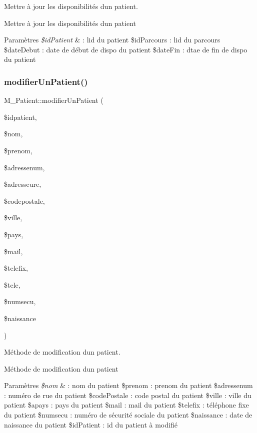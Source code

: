 Mettre à jour les disponibilités d\textquotesingle{}un patient. 

Mettre à jour les disponibilités d\textquotesingle{}un patient 
\begin{DoxyParams}{Paramètres}
{\em \$id\+Patient} & \+: l\textquotesingle{}id du patient \$id\+Parcours \+: l\textquotesingle{}id du parcours \$date\+Debut \+: date de début de dispo du patient \$date\+Fin \+: dtae de fin de dispo du patient \\
\hline
\end{DoxyParams}
\mbox{\label{class_m___patient_af56fef6b964aea361b041c9cbadf7883}} 
\subsubsection{\texorpdfstring{modifier\+Un\+Patient()}{modifierUnPatient()}}
{\footnotesize\ttfamily M\+\_\+\+Patient\+::modifier\+Un\+Patient (\begin{DoxyParamCaption}\item[{}]{\$idpatient,  }\item[{}]{\$nom,  }\item[{}]{\$prenom,  }\item[{}]{\$adressenum,  }\item[{}]{\$adresseure,  }\item[{}]{\$codepostale,  }\item[{}]{\$ville,  }\item[{}]{\$pays,  }\item[{}]{\$mail,  }\item[{}]{\$telefix,  }\item[{}]{\$tele,  }\item[{}]{\$numsecu,  }\item[{}]{\$naissance }\end{DoxyParamCaption})}



Méthode de modification d\textquotesingle{}un patient. 

Méthode de modification d\textquotesingle{}un patient 
\begin{DoxyParams}{Paramètres}
{\em \$nom} & \+: nom du patient \$prenom \+: prenom du patient \$adressenum \+: numéro de rue du patient \$code\+Postale \+: code postal du patient \$ville \+: ville du patient \$apays \+: pays du patient \$mail \+: mail du patient \$telefix \+: téléphone fixe du patient \$numsecu \+: numéro de sécurité sociale du patient \$naissance \+: date de naissance du patient \$id\+Patient \+: id du patient à modifié \\
\hline
\end{DoxyParams}
\mbox{\label{class_m___patient_a6a24b9381e5a3c218fd5fac44ceee18f}} 
